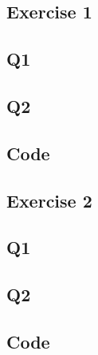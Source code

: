 \begin{appendices}
\chapter{Exercise 1}
\section{Q1}

\section{Q2}

\section{Code}
\end{appendices}

\begin{appendices}
\chapter{Exercise 2}
\section{Q1}

\section{Q2}

\section{Code}
\end{appendices}